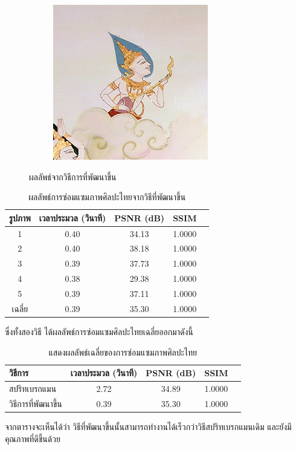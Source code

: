 \documentclass[hidelinks, a4paper,12pt]{article}
\numberwithin{equation}{section}							%
\numberwithin{equation}{section}
\begin{document}
{\begin{figure}[H]
\begin{subfigure}{0.4\linewidth}
			\includegraphics[width=0.8\linewidth]{images/result_ex4/multisplitbergman_case05.png}			
		\end{subfigure}
		\caption{ผลลัพธ์จากวิธีการที่พัฒนาขึ้น}
	\end{figure}
		\begin{table}[H]
		\centering
		\begin{tabular}[ht]{|c|c|c|c|c|}
			\hline
			รูปภาพ &เวลาประมวล  (วินาที) & PSNR (dB) & SSIM \\
			\hline
			1 & 0.40 & 34.13 & 1.0000 \\ 
			2 & 0.40 & 38.18 & 1.0000 \\
			3 &  0.39 & 37.73 & 1.0000 \\
			4 & 0.38  & 29.38  & 1.0000 \\
			5 & 0.39  & 37.11  & 1.0000 \\
			\hline
			เฉลี่ย & 0.39  & 35.30  & 1.0000 \\
			\hline
		\end{tabular}
		\caption{ผลลัพธ์การซ่อมแซมภาพศิลปะไทยจากวิธีที่พัฒนาขึ้น}
	\end{table}	 
	\hspace{1cm}ซึ่งทั้งสองวิธี ได้ผลลัพธ์การซ่อมแซมศิลปะไทยเฉลี่ยออกมาดังนี้
	\begin{table}[H]
		\centering
		\begin{tabular}[ht]{|l|c|c|c|c|}
			\hline
			วิธีการ  & เวลาประมวล  (วินาที) & PSNR (dB) & SSIM \\
			\hline
			สปริทเบรกแมน & 2.72 & 34.89 & 1.0000 \\ 
			วิธีการที่พัฒนาขึ้น & 0.39 & 35.30 & 1.0000 \\
			\hline
		\end{tabular}
		\caption{แสดงผลลัพธ์เฉลี่ยของการซ่อมแซมภาพศิลปะไทย}
	\end{table}	
	\hspace{1cm} จากตารางจะเห็นได้ว่า วิธีที่พัฒนาขึ้นนั้นสามารถทำงานได้เร็วกว่าวิธีสปริทเบรกแมนเดิม และยังมีคุณภาพที่ดีขึ้นด้วย
	
}
\end{document}
